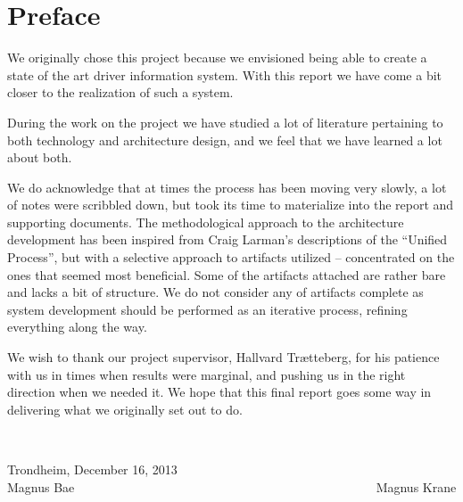 \section*{Preface}

We originally chose this project because we envisioned being able to create a
state of the art driver information system. With this report we have come a bit
closer to the realization of such a system. 

During the work on the project we have studied a lot of literature pertaining
to both technology and architecture design, and we feel that we have learned a
lot about both. 

We do acknowledge that at times the process has been moving
very slowly, a lot of notes were scribbled down, but took its time to
materialize into the report and supporting documents. The methodological
approach to the architecture development has been inspired from Craig Larman's
descriptions of the ``Unified Process'', but with a selective approach to
artifacts utilized -- concentrated on the ones that seemed most beneficial.
Some of the artifacts attached are rather bare and lacks a bit of structure. We
do not consider any of artifacts complete as system development should be
performed as an iterative process, refining everything along the way.

We wish to thank our project supervisor, Hallvard Trætteberg, for his patience
with us in times when results were marginal, and pushing us in the right 
direction when we needed it. We hope that this final
report goes some way in delivering what we originally set out to do.


\mbox{}\\[10pc]
\begin{center}
Trondheim, December 16, 2013\\[1pc]
\vspace{15 mm}
Magnus Bae ~~~~~~~~~~~~~~~~~~~~~~~~~~~~~~~~~~~~~~~~~~~~~~~ Magnus Krane
\end{center}

\clearpage

